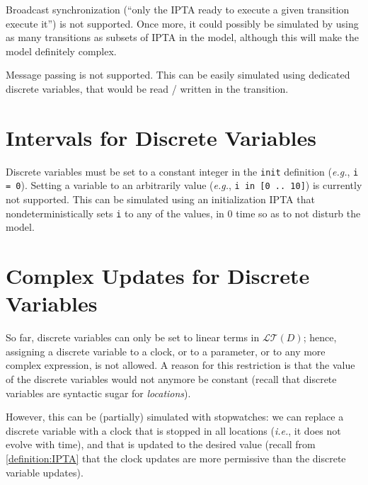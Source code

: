 \documentclass[a4paper,11pt]{report}
\makeatletter
\newcommand{\DVar}{D} %
\newcommand{\LTerm}{\mathcal{LT}} %
\newcommand{\LTermD}{\LTerm(\DVar)}
\newcommand{\IPTA}{IPTA}
\newcommand{\styleIMI}[1]{\textcolor{imicolor}{\texttt{#1}}}
\newcommand{\eg}{\textcolor{colorok}{\textit{e.g.},\@}}
\newcommand{\ie}{\textcolor{colorok}{\textit{i.e.},\@}}
\makeatother
\begin{document}


Broadcast synchronization (``only the \IPTA{} ready to execute a given transition execute it'') is not supported.
Once more, it could possibly be simulated by using as many transitions as subsets of \IPTA{} in the model, although this will make the model definitely complex.



Message passing is not supported.
This can be easily simulated using dedicated discrete variables, that would be read / written in the transition.



\section{Intervals for Discrete Variables}

Discrete variables must be set to a constant integer in the \styleIMI{init} definition (\eg{} \styleIMI{i = 0}).
Setting a variable to an arbitrarily value (\eg{} \styleIMI{i in [0 .. 10]}) is currently not supported.
This can be simulated using an initialization \IPTA{} that nondeterministically sets \styleIMI{i} to any of the values, in 0 time so as to not disturb the model.


\section{Complex Updates for Discrete Variables}

So far, discrete variables can only be set to linear terms in $\LTermD$;
hence, assigning a discrete variable to a clock, or to a parameter, or to any more complex expression, is not allowed.
A reason for this restriction is that the value of the discrete variables would not anymore be constant (recall that discrete variables are syntactic sugar for \emph{locations}).

However, this can be (partially) simulated with stopwatches: we can replace a discrete variable with a clock that is stopped in all locations (\ie{} it does not evolve with time), and that is updated to the desired value (recall from \cref{definition:IPTA} that the clock updates are more permissive than the discrete variable updates).
\end{document}
